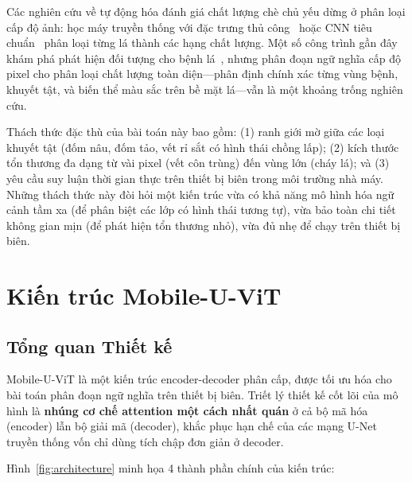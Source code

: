 \documentclass[conference]{IEEEtran}
\begin{document}
Các nghiên cứu về tự động hóa đánh giá chất lượng chè chủ yếu dừng ở phân loại cấp độ ảnh: học máy truyền thống với đặc trưng thủ công~\cite{b16} hoặc CNN tiêu chuẩn~\cite{b17} phân loại từng lá thành các hạng chất lượng. Một số công trình gần đây khám phá phát hiện đối tượng cho bệnh lá~\cite{b18}, nhưng phân đoạn ngữ nghĩa cấp độ pixel cho phân loại chất lượng toàn diện---phân định chính xác từng vùng bệnh, khuyết tật, và biến thể màu sắc trên bề mặt lá---vẫn là một khoảng trống nghiên cứu.

Thách thức đặc thù của bài toán này bao gồm: (1) ranh giới mờ giữa các loại khuyết tật (đốm nâu, đốm tảo, vết rỉ sắt có hình thái chồng lấp); (2) kích thước tổn thương đa dạng từ vài pixel (vết côn trùng) đến vùng lớn (cháy lá); và (3) yêu cầu suy luận thời gian thực trên thiết bị biên trong môi trường nhà máy. Những thách thức này đòi hỏi một kiến trúc vừa có khả năng mô hình hóa ngữ cảnh tầm xa (để phân biệt các lớp có hình thái tương tự), vừa bảo toàn chi tiết không gian mịn (để phát hiện tổn thương nhỏ), vừa đủ nhẹ để chạy trên thiết bị biên.


\section{Kiến trúc Mobile-U-ViT}

\subsection{Tổng quan Thiết kế}

Mobile-U-ViT là một kiến trúc encoder-decoder phân cấp, được tối ưu hóa cho bài toán phân đoạn ngữ nghĩa trên thiết bị biên. Triết lý thiết kế cốt lõi của mô hình là \textbf{nhúng cơ chế attention một cách nhất quán} ở cả bộ mã hóa (encoder) lẫn bộ giải mã (decoder), khắc phục hạn chế của các mạng U-Net truyền thống vốn chỉ dùng tích chập đơn giản ở decoder.

Hình~\ref{fig:architecture} minh họa 4 thành phần chính của kiến trúc:
\end{document}
